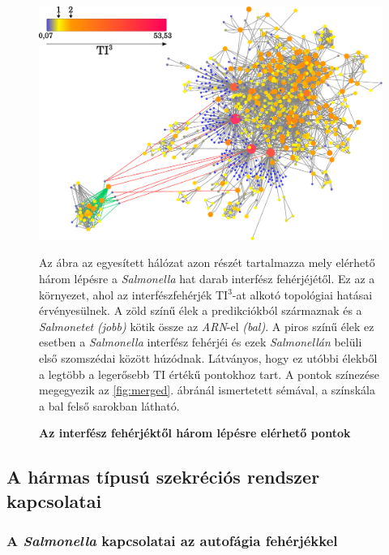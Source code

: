 \documentclass[a4paper,12pt]{article}
\newenvironment{imgdesc}{
		\small
		\singlespacing
		\begin{center}
		
	}{
		\end{center}	
	}
\begin{document}
			\begin{figure}[H]
				\includegraphics[scale=0.50]{img/merged-3-step-from-connecting-salmonella.pdf}
				\centering
				\caption{ \textbf{Az interfész fehérjéktől három lépésre elérhető pontok}}
				\begin{imgdesc}
					Az ábra az egyesített hálózat azon részét tartalmazza mely elérhető három lépésre a \textit{Salmonella} hat darab interfész fehérjéjétől. Ez az a környezet, ahol az interfészfehérjék TI$^3$-at alkotó topológiai hatásai érvényesülnek. A zöld színű élek a predikciókból származnak és a \textit{Salmonetet} \textit{(jobb)} kötik össze az \textit{ARN}-el \textit{(bal)}. A piros színű élek ez esetben a \textit{Salmonella} interfész fehérjéi és ezek \textit{Salmonellán} belüli első szomszédai között húzódnak. Látványos, hogy ez utóbbi élekből a legtöbb a legerősebb TI értékű pontokhoz tart. A pontok színezése megegyezik az \ref{fig:merged}. ábránál ismertetett sémával, a színskála a bal felső sarokban látható.
				\end{imgdesc}			
				\label{fig:merged-3-step}			 		 
			\end{figure}			
		
	\subsection{A hármas típusú szekréciós rendszer kapcsolatai}	
		
		\subsubsection{A \textit{Salmonella} kapcsolatai az autofágia fehérjékkel}
		
\end{document}
